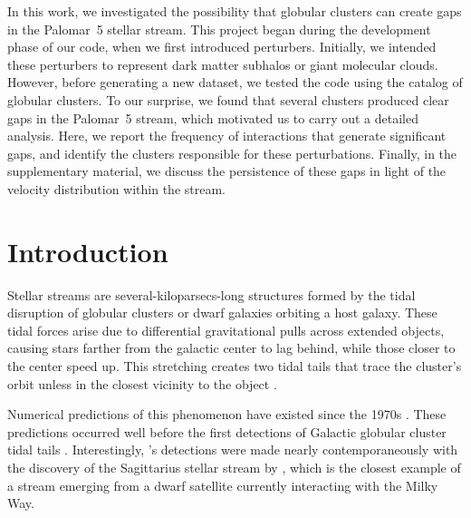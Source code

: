 
In this work, we investigated the possibility that globular clusters can create gaps in the Palomar~5 stellar stream. This project began during the development phase of our code, when we first introduced perturbers. Initially, we intended these perturbers to represent dark matter subhalos or giant molecular clouds. However, before generating a new dataset, we tested the code using the catalog of globular clusters. To our surprise, we found that several clusters produced clear gaps in the Palomar~5 stream, which motivated us to carry out a detailed analysis. Here, we report the frequency of interactions that generate significant gaps, and identify the clusters responsible for these perturbations. Finally, in the supplementary material, we discuss the persistence of these gaps in light of the velocity distribution within the stream.

\section{Introduction}
    Stellar streams are several-kiloparsecs-long structures formed by the tidal disruption of globular clusters or dwarf galaxies orbiting a host galaxy. These tidal forces arise due to differential gravitational pulls across extended objects, causing stars farther from the galactic center to lag behind, while those closer to the center speed up. This stretching creates two tidal tails that trace the cluster's orbit unless in the closest vicinity to the object \citep{2007ApJ...659.1212M}. 

    Numerical predictions of this phenomenon have existed since the 1970s \citep[see, e.g.,][]{1975AJ.....80..290K}. These predictions occurred well before the first detections of Galactic globular cluster tidal tails \citep{1995AJ....109.2553G}. Interestingly, \citet{1995AJ....109.2553G}'s detections were made nearly contemporaneously with the discovery of the Sagittarius stellar stream by \citet{1994Natur.370..194I}, which is the closest example of a stream emerging from a dwarf satellite currently interacting with the Milky Way. 

